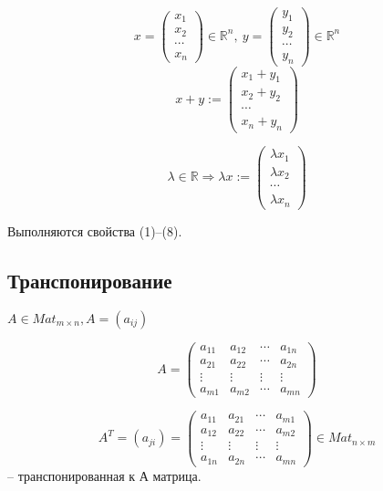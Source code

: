 \begin{equation*}x = \begin{pmatrix}
x_1 \\
x_2 \\
\cdots \\
x_n
\end{pmatrix} \in \mathbb{R}^n, \ y = \begin{pmatrix}
y_1 \\
y_2 \\
\cdots \\
y_n
\end{pmatrix} \in \mathbb{R}^n \end{equation*}
\begin{equation*}x+y:= \begin{pmatrix}
x_1 + y_1 \\
x_2 + y_2 \\
\cdots \\
x_n + y_n
\end{pmatrix}
\end{equation*}

\begin{equation*}\lambda \in \mathbb{R} \Rightarrow \lambda x := \begin{pmatrix}
\lambda x_1 \\
\lambda x_2 \\
\cdots \\
\lambda x_n 
\end{pmatrix}
\end{equation*}

Выполняются свойства (1)--(8).

\vspace{\baselineskip}
\subsection{Транспонирование}

$A \in Mat_{m \times n}, A = (a_{ij})$

\begin{equation*}A = 
	\begin{pmatrix}
		a_{11} & a_{12} & \cdots & a_{1n} \\
		a_{21} & a_{22} & \cdots & a_{2n} \\
       \vdots & \vdots & \vdots& \vdots \\ 
       a_{m1} & a_{m2} & \cdots & a_{mn}
	\end{pmatrix}
\end{equation*}

\begin{equation*} A^T = (a_{ji}) = 
	\begin{pmatrix}
		a_{11} & a_{21} & \cdots & a_{m1} \\
		a_{12} & a_{22} & \cdots & a_{m2} \\
       \vdots & \vdots & \vdots& \vdots \\ 
       a_{1n} & a_{2n} & \cdots & a_{mn}
	\end{pmatrix} \in Mat_{n \times m}
\end{equation*} 
-- транспонированная к А матрица.

